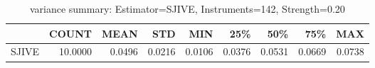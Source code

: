 \begin{table}[ht]
\centering
\caption{variance summary: Estimator=SJIVE, Instruments=142, Strength=0.20}
\begin{tabular}{lrrrrrrrr}
\toprule
 & COUNT & MEAN & STD & MIN & 25\% & 50\% & 75\% & MAX \\
\midrule
SJIVE & 10.0000 & 0.0496 & 0.0216 & 0.0106 & 0.0376 & 0.0531 & 0.0669 & 0.0738 \\
\bottomrule
\end{tabular}
\end{table}
